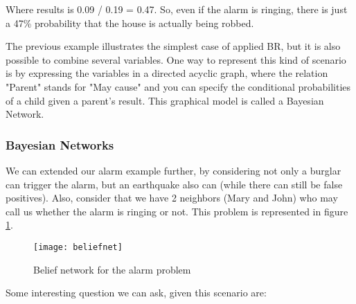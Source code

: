 Where results is 0.09 / 0.19 = 0.47. So, even if the alarm is ringing, there is
just a 47\% probability that the house is actually being robbed.

The previous example illustrates the simplest case of applied BR, but it is
also possible to combine several variables.
One way to represent this kind of scenario is by expressing the variables in a directed acyclic
graph, where the relation "Parent" stands for "May cause" and you can specify
the conditional probabilities of a child given a parent's result. This graphical
model is called a Bayesian Network.

\subsubsection{Bayesian Networks}

We can extended our alarm example further, by considering not only a burglar
can trigger the alarm, but an earthquake also can (while there can still be
false positives). Also, consider that we have 2 neighbors (Mary and John) who
may call us whether the alarm is ringing or not. This problem is represented in
figure \ref{fig:beliefnet}.

\begin{figure}[t]
  \begin{center}
    \leavevmode
    \texttt{[image: beliefnet]}
    \caption{Belief network for the alarm problem \cite{belfn}}
    \label{fig:beliefnet}
  \end{center}
\end{figure}

Some interesting question we can ask, given this scenario are:

